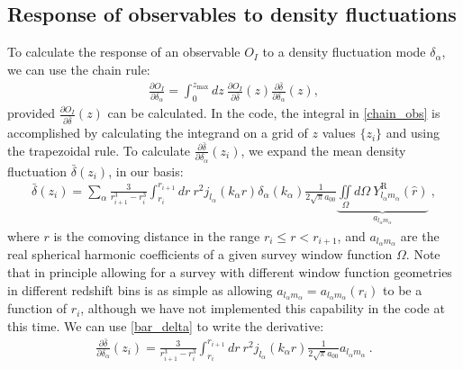 \documentclass[a4paper,11pt]{article}
\newcommand{\sph}[2]{Y^\text{R}_{l_#1 m_#1}(\hat{#2})}
\begin{document}
\subsection{Response of observables to density fluctuations}
\label{ssec:obs_response}
To calculate the response of an observable $O_I$ to a density fluctuation mode $\delta_\alpha$, we can use the chain rule:
\begin{align}\label{chain_obs}
\frac{\partial O_I}{\partial\delta_\alpha}=\int_0^{z_{\text{max}}}dz~\frac{\partial O_I}{\partial \bar{\delta}}(z)\frac{\partial \bar{\delta}}{\partial \delta_\alpha}(z),
\end{align}
provided $\frac{\partial{O_I}}{\partial \bar{\delta}}(z)$ can be calculated. In the code, the integral in \eqref{chain_obs} is accomplished by calculating the integrand on a grid of $z$ values $\{z_i\}$ and using the trapezoidal rule. To calculate $\frac{\partial\bar{\delta}}{\partial\delta_\alpha}(z_i)$, we expand the mean density fluctuation $\bar{\delta}(z_i)$, in our basis: 
\label{sec:density_fluct}
\begin{align}\label{bar_delta}
\bar{\delta}(z_i)= \displaystyle \sum_\alpha \frac{3}{r_{i+1}^3 - r_{i}^3} \int_{r_i}^ {r_{i+1} }dr ~ r^2 j_{l_\alpha}(k_\alpha r) \delta_\alpha(k_\alpha) \frac{1}{2\sqrt{\pi} a_{00}} \underbrace{ \iint\limits_\Omega d\Omega ~\sph{\alpha}{r}}_{a_{l_\alpha m_\alpha}} ~,
\end{align}
where $r$ is the comoving distance in the range $r_{i}\le r<r_{i+1}$, and $a_{l_\alpha m_\alpha}$ are the real spherical harmonic coefficients of a given survey window function $\Omega$. Note that in principle allowing for a survey with different window function geometries in different redshift bins is as simple as allowing  $a_{l_\alpha m_\alpha}=a_{l_\alpha m_\alpha}(r_i)$ to be a function of $r_i$, although we have not implemented this capability in the code at this time. We can use \eqref{bar_delta} to write the derivative:
\begin{align}
\frac{\partial \bar{\delta} }{ \partial \delta_\alpha}(z_i)=
\frac{3}{r_{i+1}^3 - r_{i}^3} \int_{r_{i}}^ {r_{i+1} }dr ~ r^2 j_{l_\alpha}(k_\alpha r)  \frac{1}{2\sqrt{\pi} a_{00}} a_{l_\alpha m_\alpha}~.
\end{align}
\end{document}
